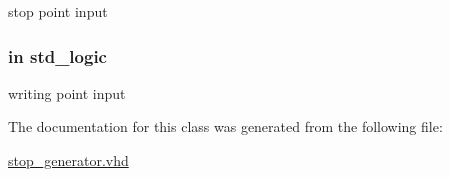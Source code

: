 stop point input 

\subsubsection[{\texorpdfstring{writing\+\_\+point}{writing_point}}]{ {\bfseries \textcolor{vhdlchar}{in}\textcolor{vhdlchar}{ }} {\bfseries \textcolor{vhdlchar}{std\+\_\+logic}\textcolor{vhdlchar}{ }} \hspace{0.3cm}{\ttfamily [Port]}}\hypertarget{classstop__generator_a12d6c9c482b5975efc30e34bb0951659}{}\label{classstop__generator_a12d6c9c482b5975efc30e34bb0951659}


writing point input 



The documentation for this class was generated from the following file\+:\begin{DoxyCompactItemize}
\item 
\hyperlink{stop__generator_8vhd}{stop\+\_\+generator.\+vhd}\end{DoxyCompactItemize}
